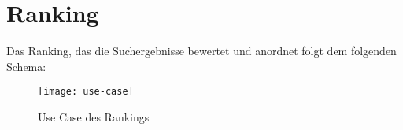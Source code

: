 \author{Lothar Mödl, Gottfried von Recum}

\section{Ranking}

Das Ranking, das die Suchergebnisse bewertet und anordnet folgt dem folgenden Schema:

\begin{figure}
	\centering
	\texttt{[image: use-case]}
	\caption{Use Case des Rankings}
	\label{fig:Ranking Use-Case}
\end{figure}
\pagebreak